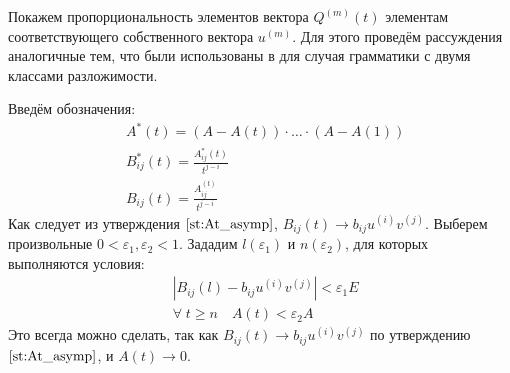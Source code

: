 \documentclass[12pt]{article}
\begin{document}
Покажем пропорциональность элементов вектора $Q^{(m)}(t)$ элементам со\-от\-вет\-ству\-ю\-ще\-го собственного вектора $u^{(m)}$. Для этого проведём рассуждения аналогичные тем, что были использованы в \cite{lit:borisov_2gr} для случая грамматики с двумя классами разложимости.

Введём обозначения: 
\begin{equation}
\begin{split}
	&A^*(t) = (A - A(t)) \cdot \ldots \cdot (A - A(1))\\
	&B^*_{ij}(t) = \frac{A^*_{ij}(t)}{t^{j-i}}\\
	&B_{ij}(t) = \frac{A_{ij}^{(t)}}{t^{j-i}}
\end{split}
\end{equation}
Как следует из утверждения $\ref{st:At_asymp}$, $B_{ij}(t) \rightarrow b_{ij}u^{(i)}v^{(j)}$. Выберем произвольные $0 < \varepsilon_1, \varepsilon_2 < 1$. Зададим $l(\varepsilon_1)$ и $n(\varepsilon_2)$, для которых выполняются условия:
\begin{equation}
\begin{split}
	&\left| B_{ij}(l) - b_{ij}u^{(i)}v^{(j)} \right| < \varepsilon_1 E\\
	&\forall \; t \geq n \quad A(t) < \varepsilon_2 A
\end{split}	
\end{equation}
Это всегда можно сделать, так как $B_{ij}(t) \rightarrow b_{ij} u^{(i)} v^{(j)}$ по утверждению $\ref{st:At_asymp}$, и $A(t) \rightarrow 0$.
\end{document}

